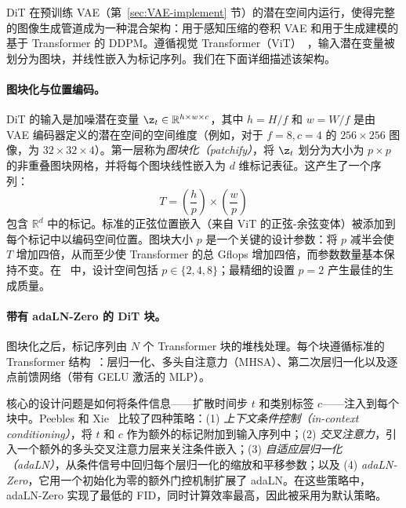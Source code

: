\documentclass[../../book-main_zh.tex]{subfiles}
\begin{document}
DiT 在预训练 VAE（第~\ref{sec:VAE-implement} 节）的潜在空间内运行，使得完整的图像生成管道成为一种混合架构：用于感知压缩的卷积 VAE 和用于生成建模的基于 Transformer 的 DDPM。遵循视觉 Transformer（ViT）~\citep{dosovitskiy2020image}，输入潜在变量被划分为图块，并线性嵌入为标记序列。我们在下面详细描述该架构。

\paragraph{图块化与位置编码。}
DiT 的输入是加噪潜在变量 $\z_t \in \mathbb{R}^{h \times w \times c}$，其中 $h = H/f$ 和 $w = W/f$ 是由 VAE 编码器定义的潜在空间的空间维度（例如，对于 $f = 8, c = 4$ 的 $256 \times 256$ 图像，为 $32 \times 32 \times 4$）。第一层称为\emph{图块化（patchify）}，将 $\z_t$ 划分为大小为 $p \times p$ 的非重叠图块网格，并将每个图块线性嵌入为 $d$ 维标记表征。这产生了一个序列：
\begin{equation}
    T = \left(\frac{h}{p}\right) \times \left(\frac{w}{p}\right)
\end{equation}
包含 $\mathbb{R}^d$ 中的标记。标准的正弦位置嵌入（来自 ViT 的正弦-余弦变体）被添加到每个标记中以编码空间位置。图块大小 $p$ 是一个关键的设计参数：将 $p$ 减半会使 $T$ 增加四倍，从而至少使 Transformer 的总 Gflops 增加四倍，而参数数量基本保持不变。在~\citep{peebles2023scalable} 中，设计空间包括 $p \in \{2, 4, 8\}$；最精细的设置 $p = 2$ 产生最佳的生成质量。

\paragraph{带有 adaLN-Zero 的 DiT 块。}
图块化之后，标记序列由 $N$ 个 Transformer 块的堆栈处理。每个块遵循标准的 Transformer 结构~\citep{vaswani2017attention}：层归一化、多头自注意力（MHSA）、第二次层归一化以及逐点前馈网络（带有 GELU 激活的 MLP）。

核心的设计问题是如何将条件信息——扩散时间步 $t$ 和类别标签 $c$——注入到每个块中。Peebles 和 Xie~\citep{peebles2023scalable} 比较了四种策略：(1) \emph{上下文条件控制（in-context conditioning）}，将 $t$ 和 $c$ 作为额外的标记附加到输入序列中；(2) \emph{交叉注意力}，引入一个额外的多头交叉注意力层来关注条件嵌入；(3) \emph{自适应层归一化（adaLN）}，从条件信号中回归每个层归一化的缩放和平移参数；以及 (4) \emph{adaLN-Zero}，它用一个初始化为零的额外门控机制扩展了 adaLN。在这些策略中，adaLN-Zero 实现了最低的 FID，同时计算效率最高，因此被采用为默认策略。
\end{document}

